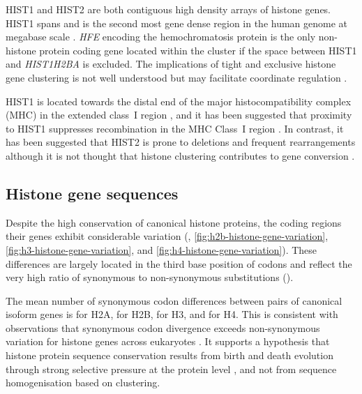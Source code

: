     HIST1 and HIST2 are both contiguous high density arrays of histone genes.
    HIST1 spans \HISTOneSpan{} 
    and is the second most gene dense region in the human genome at
    megabase scale \citep{MHC-III-analysis}.
    \textit{HFE} encoding the hemochromatosis protein \citep{AlbigDoenecke1998}
    is the only non-histone protein coding gene located within the cluster
    if the space between HIST1 and \textit{HIST1H2BA} is excluded.
    The implications of tight and exclusive histone gene clustering
    is not well understood but may facilitate coordinate regulation
    \citep{Eirinlopez2009,close-regulators}.

    HIST1 is located towards the distal end of the major histocompatibility complex (MHC)
    in the extended class~I region \citep{MHC-I-transcript, MHC-complete-sequencing-1999},
    and it has been suggested that proximity to HIST1
    suppresses recombination in the MHC Class~I region \citep{MHC-repressed-by-HIST}.
    In contrast, it has been suggested that HIST2 is prone to
    deletions and frequent rearrangements
    \citep{HISTTwo-prone-deletion-discovery, HISTTwo-prone-deletion-focus}
    although it is not thought that histone clustering contributes to
    gene conversion \citep{NeiRooney2005}.

  \subsection{Histone gene sequences}
    Despite the high conservation of canonical histone proteins,
    the coding regions their genes exhibit considerable variation
    (, \ref{fig:h2b-histone-gene-variation},
    \ref{fig:h3-histone-gene-variation}, and \ref{fig:h4-histone-gene-variation}).
    These differences are largely located in the third base position of codons 
    and reflect the very high ratio of synonymous to non-synonymous
    substitutions ().

    The mean number of synonymous codon differences between pairs of canonical isoform genes is
     for H2A,
     for H2B,
     for H3,
    and  for H4.
    This is consistent with observations that
    synonymous codon divergence exceeds non-synonymous variation
    for histone genes across eukaryotes \citep{Piontkivska2002, Rooney2002}.
    It supports a hypothesis that histone protein sequence conservation
    results from birth and death evolution through strong selective pressure
    at the protein level \citep{NeiRooney2005},
    and not from sequence homogenisation based on clustering.


